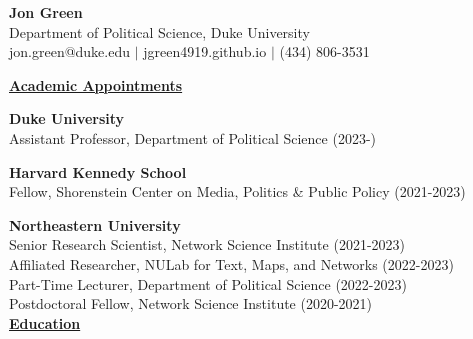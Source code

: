 \documentclass{article}
\begin{document}
\begin{center}
\thispagestyle{empty}
\large \textbf{Jon Green} \\
\normalsize Department of Political Science, Duke University\\
\normalsize jon.green@duke.edu $\mid$ jgreen4919.github.io $\mid$ (434) 806-3531
\end{center}

\noindent \textbf{\underline{Academic Appointments}}

\noindent \textbf{Duke University}\\
\indent Assistant Professor, Department of Political Science (2023-)

\noindent \textbf{Harvard Kennedy School}\\
\indent Fellow, Shorenstein Center on Media, Politics \& Public Policy (2021-2023)

\noindent \textbf{Northeastern University}\\
\indent Senior Research Scientist, Network Science Institute (2021-2023)\\
\indent Affiliated Researcher, NULab for Text, Maps, and Networks (2022-2023) \\
\indent Part-Time Lecturer, Department of Political Science (2022-2023) \\
\indent Postdoctoral Fellow, Network Science Institute (2020-2021) \\


\noindent \textbf{\underline{Education}}
\end{document}
